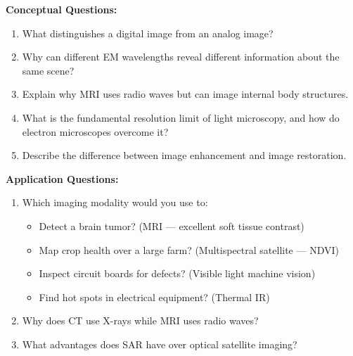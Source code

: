 \documentclass[12pt,a4paper]{article}
\begin{document}
\begin{examplebox}
\textbf{Conceptual Questions:}
\begin{enumerate}
    \item What distinguishes a digital image from an analog image?
    
    \item Why can different EM wavelengths reveal different information about the same scene?
    
    \item Explain why MRI uses radio waves but can image internal body structures.
    
    \item What is the fundamental resolution limit of light microscopy, and how do electron microscopes overcome it?
    
    \item Describe the difference between image enhancement and image restoration.
\end{enumerate}

\textbf{Application Questions:}
\begin{enumerate}
    \item Which imaging modality would you use to:
    \begin{itemize}
        \item Detect a brain tumor? (MRI --- excellent soft tissue contrast)
        \item Map crop health over a large farm? (Multispectral satellite --- NDVI)
        \item Inspect circuit boards for defects? (Visible light machine vision)
        \item Find hot spots in electrical equipment? (Thermal IR)
    \end{itemize}
    
    \item Why does CT use X-rays while MRI uses radio waves?
    
    \item What advantages does SAR have over optical satellite imaging?
\end{enumerate}
\end{examplebox}
\end{document}
